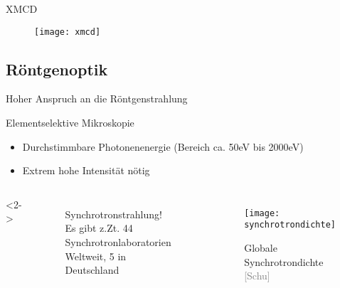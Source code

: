 



\begin{frame}{XMCD}{}
	\begin{figure}[H]
		\begin{center}
			\texttt{[image: xmcd]}
		\end{center}
	\end{figure}
\end{frame}


\subsection{Röntgenoptik}
\begin{frame}{Hoher Anspruch an die Röntgenstrahlung}{}
	\begin{block}{Elementselektive Mikroskopie}
		\begin{itemize}
		  \item Durchstimmbare Photonenenergie (Bereich ca. 50eV bis 2000eV)
		  \item Extrem hohe Intensität nötig
		\end{itemize}		
	\end{block}

		\begin{columns}<2->
		 	\begin{figure}[H]
				\begin{exampleblock}{Synchrotronstrahlung!}
					Es gibt z.Zt. 44 Synchrotronlaboratorien Weltweit, 5 in Deutschland
				\end{exampleblock}
			\end{figure}
			\begin{figure}[H]
				\begin{center}
					\texttt{[image: synchrotrondichte]}
					\caption{Globale Synchrotrondichte  \tiny{\textcolor{gray}{[Schu]}}}
				\end{center}
			\end{figure}
		\end{columns}
\end{frame}

